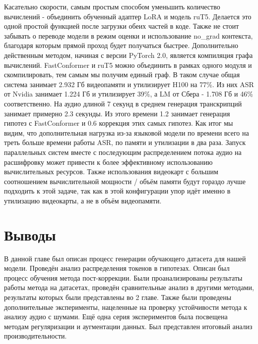Касательно скорости, самым простым способом уменьшить количество вычислений - объединить обученный адаптер LoRA и модель ruT5.
Делается это одной простой функцией после загрузки обеих частей в коде.
Также не стоит забывать о переводе модели в режим оценки и использование no\_grad контекста, благодаря которым прямой проход будет получаться быстрее.
Дополнительно действенным методом, начиная с версии PyTorch 2.0, является компиляция графа вычислений.
FastConformer и ruT5 можно объединить в рамках одного модуля и скомпилировать, тем самым мы получим единый граф.
В таком случае общая система занимает 2.932 Гб видеопамяти и утилизирует H100 на 77\%.
Из них ASR от Nvidia занимает 1.224 Гб и утилизирует 39\%, а LM от Сбера - 1.708 Гб и 46\% соответственно.
На аудио длиной 7 секунд в среднем генерация транскрипций занимает примерно 2.3 секунды.
Из этого времени 1.2 занимает генерация гипотез с FastConformer и 0.6 коррекция этих самых гипотез.
Как итог мы видим, что дополнительная нагрузка из-за языковой модели по времени всего на треть больше времени работы ASR, по памяти и утилизации в два раза.
Запуск параллельных систем вместе с последующим распределением потока аудио на расшифровку может привести к более эффективному использованию вычислительных ресурсов.
Также использования видеокарт с большим соотношением вычислительной мощности / объём памяти будут гораздо лучше подходить к этой задаче, так как в этой конфигурации упор идёт именно в утилизацию видеокарты, а не в объём видеопамяти.

\section{Выводы}
В данной главе был описан процесс генерации обучающего датасета для нашей модели.
Проведён анализ распределения токенов в гипотезах.
Описан был процесс обучения метода пост-коррекции.
Были проанализированы результаты работы метода на датасетах, проведён сравнительные анализ в другими методами, результаты которых были представлены во 2 главе.
Также были проведены дополнительные эксперименты, нацеленные на проверку устойчивости метода к анализу аудио с шумами.
Ещё одна серия экспериментов была посвещена методам регуляризации и аугментации данных.
Был представлен итоговый анализ производительности.
